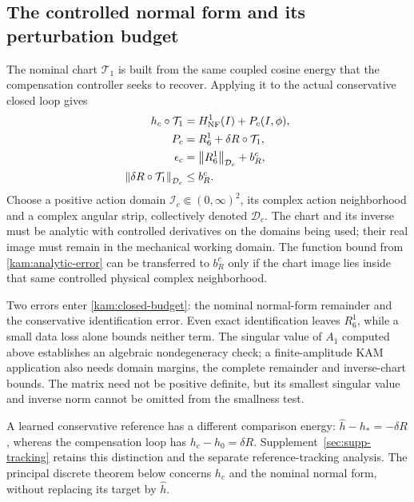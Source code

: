 \subsection{The controlled normal form and its perturbation budget}
\label{kam:closed-budget-section}

The nominal chart $\mathcal T_1$ is built from the same coupled cosine energy that the compensation controller seeks to recover. Applying it to the actual conservative closed loop gives
\begin{equation}\label{kam:closed-budget}
\begin{aligned}
 h_c\circ\mathcal T_1
    &=H_{\rm NF}^{1}(I)+P_c(I,\phi),\\
 P_c&=R_6^{1}+\delta R\circ\mathcal T_1,\\
 \epsilon_c&=\left\lVert R_6^{1}\right\rVert_{\mathcal D_c}+b_R^c,\\
 \left\lVert\delta R\circ\mathcal T_1\right\rVert_{\mathcal D_c}&\le b_R^c.
\end{aligned}
\end{equation}
Choose a positive action domain $\mathcal I_c\Subset(0,\infty)^2$, its complex action neighborhood and a complex angular strip, collectively denoted $\mathcal D_c$. The chart and its inverse must be analytic with controlled derivatives on the domains being used; their real image must remain in the mechanical working domain. The function bound from \eqref{kam:analytic-error} can be transferred to $b_R^c$ only if the chart image lies inside that same controlled physical complex neighborhood.

Two errors enter \eqref{kam:closed-budget}: the nominal normal-form remainder and the conservative identification error. Even exact identification leaves $R_6^1$, while a small data loss alone bounds neither term. The singular value of $A_1$ computed above establishes an algebraic nondegeneracy check; a finite-amplitude KAM application also needs domain margins, the complete remainder and inverse-chart bounds. The matrix need not be positive definite, but its smallest singular value and inverse norm cannot be omitted from the smallness test.

A learned conservative reference has a different comparison energy: $\widehat h-h_*=-\delta R$, whereas the compensation loop has $h_c-h_0=\delta R$. Supplement~\ref{sec:supp-tracking} retains this distinction and the separate reference-tracking analysis. The principal discrete theorem below concerns $h_c$ and the nominal normal form, without replacing its target by $\widehat h$.


